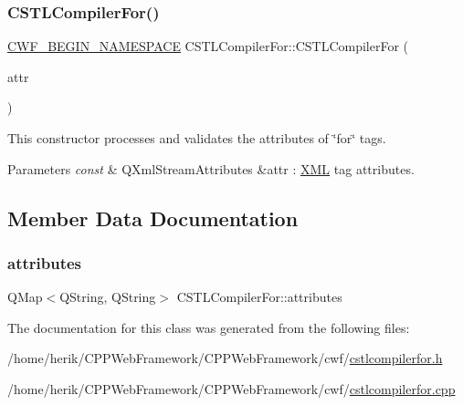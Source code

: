 \subsubsection{\texorpdfstring{C\+S\+T\+L\+Compiler\+For()}{CSTLCompilerFor()}}
{\footnotesize\ttfamily \hyperlink{cppwebframework__global_8h_a7492e9498cbaf9cd17dbc2215d3a0e48}{C\+W\+F\+\_\+\+B\+E\+G\+I\+N\+\_\+\+N\+A\+M\+E\+S\+P\+A\+CE} C\+S\+T\+L\+Compiler\+For\+::\+C\+S\+T\+L\+Compiler\+For (\begin{DoxyParamCaption}\item[{const Q\+Xml\+Stream\+Attributes \&}]{attr }\end{DoxyParamCaption})\hspace{0.3cm}{\ttfamily [explicit]}}



This constructor processes and validates the attributes of \char`\"{}for\char`\"{} tags. 


\begin{DoxyParams}{Parameters}
{\em const} & Q\+Xml\+Stream\+Attributes \&attr \+: \hyperlink{namespace_x_m_l}{X\+ML} tag attributes. \\
\hline
\end{DoxyParams}


\subsection{Member Data Documentation}
\mbox{\label{class_c_s_t_l_compiler_for_af3fc4b37c220af702aa93ea69b99cec6}} 
\subsubsection{\texorpdfstring{attributes}{attributes}}
{\footnotesize\ttfamily Q\+Map$<$Q\+String, Q\+String$>$ C\+S\+T\+L\+Compiler\+For\+::attributes}



The documentation for this class was generated from the following files\+:\begin{DoxyCompactItemize}
\item 
/home/herik/\+C\+P\+P\+Web\+Framework/\+C\+P\+P\+Web\+Framework/cwf/\hyperlink{cstlcompilerfor_8h}{cstlcompilerfor.\+h}\item 
/home/herik/\+C\+P\+P\+Web\+Framework/\+C\+P\+P\+Web\+Framework/cwf/\hyperlink{cstlcompilerfor_8cpp}{cstlcompilerfor.\+cpp}\end{DoxyCompactItemize}
